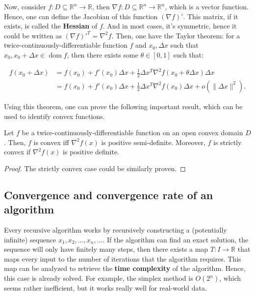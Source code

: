 Now, consider \( f: D \subseteq \mathbb{R}^{n} \to  \mathbb{R} \), then \(
\nabla f: D \subseteq \mathbb{R}^{n} \to  \mathbb{R}^{n} \), which is a vector
function. Hence, one can define the Jacobian of this function \( (\nabla f)' \).
This matrix, if it exists, is called the \textbf{Hessian} of \( f \). And in
most cases, it's symmetric, hence it could be written as \( (\nabla f)'^{T} =
\nabla ^2 f \). Then, one have the Taylor theorem: for a
twice-continuously-differentiable function \( f \) and \( x_{0}, \Delta x \)
such that \( x_{0}, x_{0} + \Delta x \in \operatorname{dom} f \), then there
exists some \( \theta \in [0, 1] \) such that:

\begin{align*}
  f(x_{0}+\Delta x) &= f(x_{0}) + f'(x_{0})\Delta x + \frac{1}{2} \Delta x^{T}
  \nabla ^2f(x_{0} + \theta \Delta x) \Delta x\\
&= f(x_{0}) + f'(x_{0})\Delta x + \frac{1}{2} \Delta x^{T}
  \nabla ^2f(x_{0}) \Delta x + o(\|\Delta x\|^2)
.\end{align*}

Using this theorem, one can prove the following important result, which can be
used to identify convex functions.

\begin{theorem}
  Let \( f \) be a twice-continuously-differentiable function on an open convex
  domain \( D \). Then, \( f \) is convex iff \( \nabla ^2 f(x) \) is
  positive semi-definite. Moreover, \( f \) is strictly convex if \( \nabla ^2
  f(x) \) is positive definite.
\end{theorem}

\begin{proof}
  The strictly convex case could be similarly proven.
\end{proof}
\fi

\subsection{Convergence and convergence rate of an algorithm} %
\label{sub:Convergence and convergence rate of an algorithm}

Every recursive algorithm works by recursively constructing a (potentially
infinite) sequence \( x_{1}, x_{2}, \ldots , x_{n}, \ldots  \). If the algorithm
can find an exact solution, the sequence will only have finitely many steps,
then there exists a map \( T: I \to \mathbb{R} \) that maps every input to the
number of iterations that the algorithm requires. This map can be analyzed to
retrieve the \textbf{time complexity} of the algorithm. Hence, this case is
already solved. For example, the simplex method is \( O(2^{n}) \), which seems
rather inefficient, but it works really well for real-world data.

